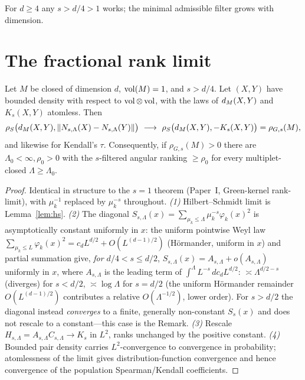 For $d\ge4$ any $s>d/4>1$ works; the minimal admissible filter grows with dimension.

\section{The fractional rank limit}

\begin{theorem}\label{thm:fraclimit}
Let $M$ be closed of dimension $d$, $\operatorname{vol}(M)=1$, and $s>d/4$. Let $(X,Y)$ have bounded
density with respect to $\operatorname{vol}\otimes\operatorname{vol}$, with the laws of $d_M(X,Y)$ and $K_s(X,Y)$
atomless. Then
\[
\rho_S\bigl(d_M(X,Y),\lVert N_{s,\Lambda}(X)-N_{s,\Lambda}(Y)\rVert\bigr)\ \longrightarrow\
\rho_S\bigl(d_M(X,Y),-K_s(X,Y)\bigr)=\rho_{G,s}(M),
\]
and likewise for Kendall's $\tau$. Consequently, if $\rho_{G,s}(M)>0$ there are
$\Lambda_0<\infty,\rho_0>0$ with the $s$-filtered angular ranking $\ge\rho_0$ for every
multiplet-closed $\Lambda\ge\Lambda_0$.
\end{theorem}

\begin{proof}
Identical in structure to the $s=1$ theorem (Paper~I, Green-kernel rank-limit), with
$\mu_k^{-1}$ replaced by $\mu_k^{-s}$ throughout. \emph{(1)} Hilbert--Schmidt limit is
Lemma~\ref{lem:hs}. \emph{(2)} The diagonal $S_{s,\Lambda}(x)=\sum_{\mu_k\le\Lambda}\mu_k^{-s}\varphi_k(x)^2$
is asymptotically constant uniformly in $x$: the uniform pointwise Weyl law
$\sum_{\mu_k\le L}\varphi_k(x)^2=c_dL^{d/2}+O(L^{(d-1)/2})$ (H\"ormander, uniform in $x$) and
partial summation give, \emph{for $d/4<s\le d/2$}, $S_{s,\Lambda}(x)=A_{s,\Lambda}+o(A_{s,\Lambda})$
uniformly in $x$, where $A_{s,\Lambda}$ is the leading term of $\int^\Lambda L^{-s}\,dc_dL^{d/2}$:
$\asymp\Lambda^{d/2-s}$ (diverges) for $s<d/2$, $\asymp\log\Lambda$ for $s=d/2$ (the uniform
Hörmander remainder $O(L^{(d-1)/2})$ contributes a relative $O(\Lambda^{-1/2})$, lower order).
For $s>d/2$ the diagonal instead \emph{converges} to a finite, generally non-constant $S_s(x)$
and does not rescale to a constant---this case is the Remark. \emph{(3)} Rescale $H_{s,\Lambda}=A_{s,\Lambda}C_{s,\Lambda}\to K_s$
in $L^2$, ranks unchanged by the positive constant. \emph{(4)} Bounded pair density carries
$L^2$-convergence to convergence in probability; atomlessness of the limit gives distribution-function
convergence and hence convergence of the population Spearman/Kendall coefficients.
\end{proof}

